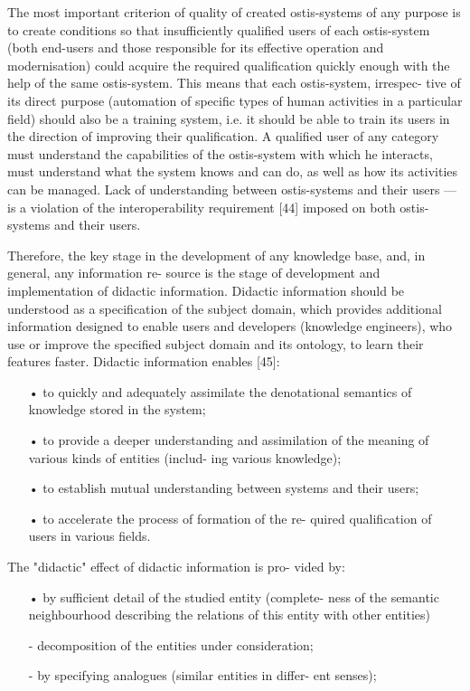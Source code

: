 \documentclass{article}
\begin{document}
\begin{multicols}{2}
\quad
The most important criterion of quality of created
ostis-systems of any purpose is to create conditions so
that insufficiently qualified users of each ostis-system
(both end-users and those responsible for its effective
operation and modernisation) could acquire the required
qualification quickly enough with the help of the same
ostis-system. This means that each ostis-system, irrespec-
tive of its direct purpose (automation of specific types of
human activities in a particular field) should also be a
training system, i.e. it should be able to train its users in
the direction of improving their qualification. A qualified
user of any category must understand the capabilities of
the ostis-system with which he interacts, must understand
what the system knows and can do, as well as how
its activities can be managed. Lack of understanding
between ostis-systems and their users — is a violation
of the interoperability requirement [44] imposed on both
ostis-systems and their users.

\quad
Therefore, the key stage in the development of any
knowledge base, and, in general, any information re-
source is the stage of development and implementation
of didactic information. Didactic information should be
understood as a specification of the subject domain,
which provides additional information designed to enable
users and developers (knowledge engineers), who use or
improve the specified subject domain and its ontology, to
learn their features faster. Didactic information enables
[45]:

\begin{itemize}
    
\item[•]to quickly and adequately assimilate the denotational
semantics of knowledge stored in the system;
\item[•]to provide a deeper understanding and assimilation
of the meaning of various kinds of entities (includ-
ing various knowledge);
\item[•]to establish mutual understanding between systems
and their users;
\item[•]to accelerate the process of formation of the re-
quired qualification of users in various fields.
\end{itemize}
The "didactic" effect of didactic information is pro-
vided by:
\begin{itemize}
\item[•]by sufficient detail of the studied entity (complete-
ness of the semantic neighbourhood describing the
relations of this entity with other entities)
\item[-]decomposition of the entities under consideration;
\item[-]by specifying analogues (similar entities in differ-
ent senses);

\end{itemize}
\end{multicols}
\end{document}
